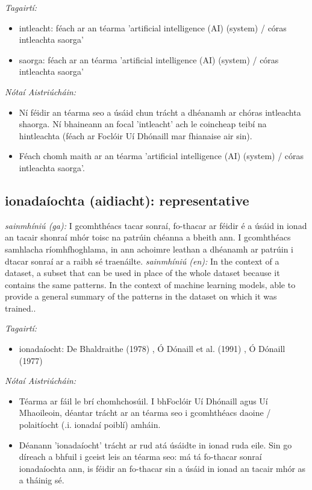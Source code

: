 \documentclass{article}
\begin{document}
 \noindent \textit{Tagairtí:}
\begin{itemize}
	\item intleacht: féach ar an téarma 'artificial intelligence (AI) (system) / córas intleachta saorga'
	\item saorga: féach ar an téarma 'artificial intelligence (AI) (system) / córas intleachta saorga'
\end{itemize}

 \noindent \textit{Nótaí Aistriúcháin:}
\begin{itemize}
	\item Ní féidir an téarma seo a úsáid chun trácht a dhéanamh ar chóras intleachta shaorga. Ní bhaineann an focal 'intleacht' ach le coincheap teibí na hintleachta (féach ar Foclóir Uí Dhónaill mar fhianaise air sin).
	\item Féach chomh maith ar an téarma 'artificial intelligence (AI) (system) / córas intleachta saorga'.
\end{itemize}


\subsection*{ionadaíochta (aidiacht): representative} 
 \noindent \textit{sainmhíniú (ga):} I gcomhthéacs tacar sonraí, fo-thacar ar féidir é a úsáid in ionad an tacair shonraí mhór toisc na patrúin chéanna a bheith ann. I gcomhthéacs samhlacha ríomhfhoghlama, in ann achoimre leathan a dhéanamh ar patrúin i dtacar sonraí ar a raibh sé traenáilte.
\newline\newline
 \noindent \textit{sainmhíniú (en):} In the context of a dataset, a subset that can be used in place of the whole dataset because it contains the same patterns. In the context of machine learning models, able to provide a general summary of the patterns in the dataset on which it was trained..
\newline

 \noindent \textit{Tagairtí:}
\begin{itemize}
	\item ionadaíocht: De Bhaldraithe (1978) \cite{de-bhaldraithe}, Ó Dónaill et al. (1991) \cite{focloir-beag}, Ó Dónaill (1977) \cite{odonaill}
\end{itemize}

 \noindent \textit{Nótaí Aistriúcháin:}
\begin{itemize}
	\item Téarma ar fáil le brí chomhchosúil. I bhFoclóir Uí Dhónaill agus Uí Mhaoileoin, déantar trácht ar an téarma seo i gcomhthéacs daoine / polaitíocht (.i. ionadaí poiblí) amháin.
	\item Déanann 'ionadaíocht' trácht ar rud atá úsáidte in ionad ruda eile. Sin go díreach a bhfuil i gceist leis an téarma seo: má tá fo-thacar sonraí ionadaíochta ann, is féidir an fo-thacar sin a úsáid in ionad an tacair mhór as a tháinig sé.
\end{itemize}
\end{document}
